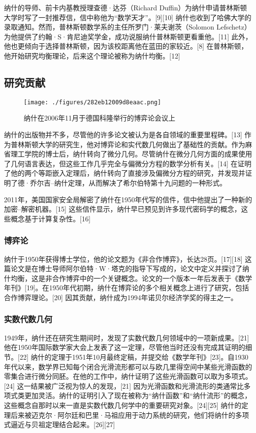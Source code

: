 纳什的导师、前卡内基教授理查德·达芬（Richard Duffin）为纳什申请普林斯顿大学时写了一封推荐信，信中称他为“数学天才”。[9][10] 纳什也收到了哈佛大学的录取通知。然而，普林斯顿数学系的主任所罗门·莱夫谢茨（Solomon Lefschetz）为他提供了约翰·S·肯尼迪奖学金，成功说服纳什普林斯顿更看重他。[11] 此外，他也更倾向于选择普林斯顿，因为该校距离他在蓝田的家较近。[8] 在普林斯顿，他开始研究均衡理论，后来这个理论被称为纳什均衡。[12]
\subsection{研究贡献}
\begin{figure}[ht]
\centering
\texttt{[image: ./figures/282eb12009d8eaac.png]}
\caption{纳什在2006年11月于德国科隆举行的博弈论会议上} \label{fig_JFNJY_2}
\end{figure}
纳什的出版物并不多，尽管他的许多论文被认为是各自领域的重要里程碑。[13] 作为普林斯顿大学的研究生，他对博弈论和实代数几何做出了基础性的贡献。作为麻省理工学院的博士后，纳什转向了微分几何。尽管纳什在微分几何方面的成果使用了几何语言表达，但这些工作几乎完全与偏微分方程的数学分析有关。[14] 在证明了他的两个等距嵌入定理后，纳什转向了直接涉及偏微分方程的研究，并发现并证明了德·乔尔吉–纳什定理，从而解决了希尔伯特第十九问题的一种形式。

2011年，美国国家安全局解密了纳什在1950年代写的信件，信中他提出了一种新的加密–解密机器。[15] 这些信件显示，纳什早已预见到许多现代密码学的概念，这些概念基于计算复杂性。[16]
\subsubsection{博弈论}  
纳什于1950年获得博士学位，他的论文题为《非合作博弈》，长达28页。[17][18] 这篇论文是在博士导师阿尔伯特·W·塔克的指导下写成的，论文中定义并探讨了纳什均衡，这是非合作博弈中的一个关键概念。论文的一个版本一年后发表于《数学年刊》[19]。在1950年代初期，纳什在博弈论的多个相关概念上进行了研究，包括合作博弈理论。[20] 因其贡献，纳什成为1994年诺贝尔经济学奖的得主之一。
\subsubsection{实数代数几何}  
1949年，纳什还在研究生期间时，发现了实数代数几何领域中的一项新成果。[21] 他在1950年国际数学家大会上发表了这一定理，尽管他当时还没有完成其证明的细节。[22] 纳什的定理于1951年10月最终定稿，并提交给《数学年刊》[23]。自1930年代以来，数学界已知每个闭合光滑流形都可以与欧几里得空间中某些光滑函数的零集合进行微分同胚。在他的工作中，纳什证明了这些光滑函数可以取为多项式。[24] 这一结果被广泛视为惊人的发现，[21] 因为光滑函数和光滑流形的类通常比多项式类更加灵活。纳什的证明引入了现在被称为“纳什函数”和“纳什流形”的概念，这些概念自那时以来一直是实数代数几何学中的重要研究对象。[24][25] 纳什的定理后来被迈克尔·阿尔廷和巴里·马祖应用于动力系统的研究，他们将纳什的多项式逼近与贝祖定理结合起来。[26][27]